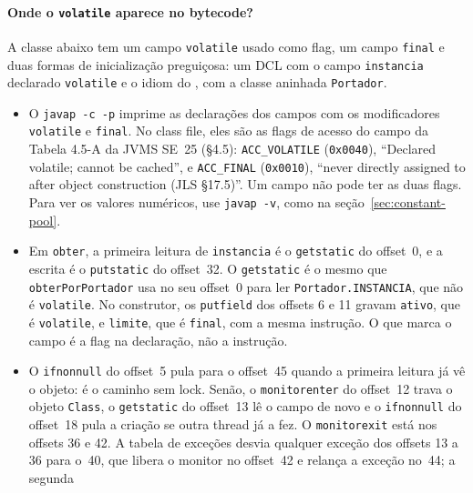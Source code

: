 \paragraph{Onde o \texttt{volatile} aparece no bytecode?}
A classe abaixo tem um campo \texttt{volatile} usado como flag, um campo
\texttt{final} e duas formas de inicialização preguiçosa: um DCL com o
campo \texttt{instancia} declarado \texttt{volatile} e o idiom do
, com a classe aninhada \texttt{Portador}.




\begin{itemize}
\item O \texttt{javap -c -p} imprime as declarações dos campos com os
  modificadores \texttt{volatile} e \texttt{final}. No class file, eles
  são as flags de acesso do campo da Tabela 4.5-A da JVMS SE~25 (§4.5):
  \texttt{ACC\_VOLATILE} (\texttt{0x0040}), \enquote{Declared volatile;
  cannot be cached}, e \texttt{ACC\_FINAL} (\texttt{0x0010}),
  \enquote{never directly assigned to after object construction (JLS
  §17.5)}. Um campo não pode ter as duas flags. Para ver os valores
  numéricos, use \texttt{javap -v}, como na seção~\ref{sec:constant-pool}.
\item Em \texttt{obter}, a primeira leitura de \texttt{instancia} é o
  \texttt{getstatic} do offset~0, e a escrita é o \texttt{putstatic} do
  offset~32. O \texttt{getstatic} é o mesmo que
  \texttt{obterPorPortador} usa no seu offset~0 para ler
  \texttt{Portador.INSTANCIA}, que não é \texttt{volatile}. No
  construtor, os \texttt{putfield} dos offsets 6 e 11 gravam
  \texttt{ativo}, que é \texttt{volatile}, e \texttt{limite}, que é
  \texttt{final}, com a mesma instrução. O que marca o campo é a flag na
  declaração, não a instrução.
\item O \texttt{ifnonnull} do offset~5 pula para o offset~45 quando a
  primeira leitura já vê o objeto: é o caminho sem lock. Senão, o
  \texttt{monitorenter} do offset~12 trava o objeto \texttt{Class}, o
  \texttt{getstatic} do offset~13 lê o campo de novo e o
  \texttt{ifnonnull} do offset~18 pula a criação se outra thread já a
  fez. O \texttt{monitorexit} está nos offsets 36 e 42. A tabela de
  exceções desvia qualquer exceção dos offsets 13 a 36 para o~40, que
  libera o monitor no offset~42 e relança a exceção no~44; a segunda

\end{itemize}
